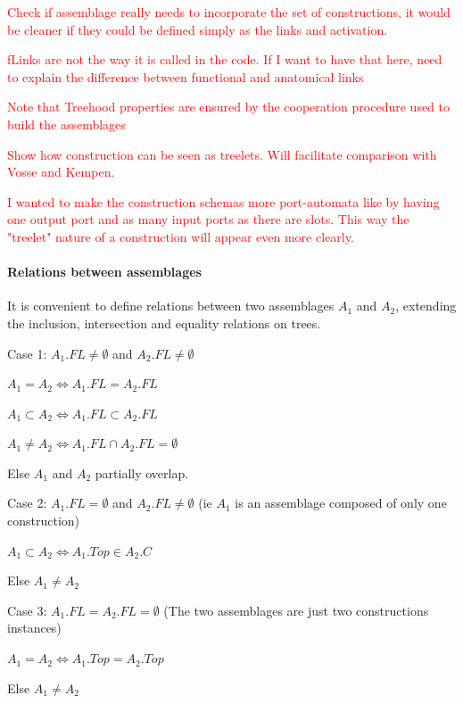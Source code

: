 \documentclass{article}
\newcommand\todo[1]{\textcolor{red}{#1}}
\begin{document}
\todo{Check if assemblage really needs to incorporate the set of constructions, it would be cleaner if they could be defined simply as the links and activation.}

\todo{fLinks are not the way it is called in the code. If I want to have that here, need to explain the difference between functional and anatomical links}

\todo{Note that Treehood properties are ensured by the cooperation procedure used to build the assemblages}

\todo{Show how construction can be seen as treelets. Will facilitate comparison with Vosse and Kempen.}

\todo{I wanted to make the construction schemas more port-automata like by having one output port and as many input ports as there are slots. This way the "treelet" nature of a construction will appear even more clearly.}

\paragraph{Relations between assemblages}
It is convenient to define relations between two assemblages $A_1$ and $A_2$, extending the inclusion, intersection and equality relations on trees. 
\begin{description}
	\item{Case 1:} $A_1.FL \neq \emptyset$ and $A_2.FL \neq \emptyset$
	\begin{description}
		\item $A_1 = A_2 \Leftrightarrow A_1.FL = A_2.FL$
		\item $A_1 \subset A_2 \Leftrightarrow A_1.FL \subset A_2.FL$
		\item $A_1 \neq A_2 \Leftrightarrow A_1.FL \cap A_2.FL = \emptyset$
		\item Else  $A_1$ and $A_2$ partially overlap.
	\end{description}
	\item{Case 2:} $A_1.FL = \emptyset$ and $A_2.FL \neq \emptyset$ (ie $A_1$ is an assemblage composed of only one construction) 
	\begin{description}
		\item $A_1 \subset A_2 \Leftrightarrow A_1.Top \in A_2.C$
		\item Else $A_1 \neq A_2$
	\end{description}
	\item{Case 3:} $A_1.FL = A_2.FL = \emptyset$ (The two assemblages are just two constructions instances)
	\begin{description}
		\item $A_1 = A_2 \Leftrightarrow A_1.Top = A_2.Top$
		\item Else $A_1 \neq A_2$
	\end{description}
\end{description}
\end{document}
